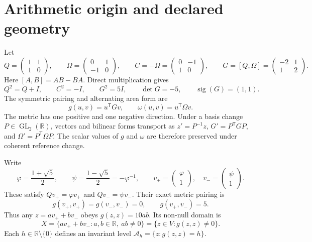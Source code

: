 \documentclass[10pt,letterpaper]{article}
\theoremstyle{definition}\newtheorem{definition}[theorem]{Definition}
\newcommand{\RR}{\mathbb R}
\newcommand{\Id}{I}
\newcommand{\GL}{\operatorname{GL}}
\newcommand{\Ah}{\mathcal A_h}
\newcommand{\ph}{\varphi}
\begin{document}
\section{Arithmetic origin and declared geometry}
Let
\begin{equation}\label{eq:root}
 Q=\begin{pmatrix}1&1\\1&0\end{pmatrix},\qquad
 \Omega=\begin{pmatrix}0&1\\-1&0\end{pmatrix},\qquad
 C=-\Omega=\begin{pmatrix}0&-1\\1&0\end{pmatrix},\qquad
 G=[Q,\Omega]=\begin{pmatrix}-2&1\\1&2\end{pmatrix}.
\end{equation}
Here $[A,B]=AB-BA$. Direct multiplication gives
\begin{equation}\label{eq:rootrels}
 Q^2=Q+\Id,\qquad C^2=-\Id,\qquad G^2=5\Id,\qquad
 \det G=-5,\qquad \operatorname{sig}(G)=(1,1).
\end{equation}
The symmetric pairing and alternating area form are
\begin{equation}
 g(u,v)=u^{\mathsf T}Gv,\qquad \omega(u,v)=u^{\mathsf T}\Omega v.
\end{equation}
The metric has one positive and one negative direction. Under a basis change $P\in\GL_2(\RR)$, vectors and bilinear forms transport as $z'=P^{-1}z$, $G'=P^{\mathsf T}GP$, and $\Omega'=P^{\mathsf T}\Omega P$. The scalar values of $g$ and $\omega$ are therefore preserved under coherent reference change.

Write
\begin{equation}\label{eq:eigen}
 \ph=\frac{1+\sqrt5}{2},\qquad \psi=\frac{1-\sqrt5}{2}=-\ph^{-1},\qquad
 v_+=\begin{pmatrix}\ph\\1\end{pmatrix},\quad
 v_-=\begin{pmatrix}\psi\\1\end{pmatrix}.
\end{equation}
These satisfy $Qv_+=\ph v_+$ and $Qv_-=\psi v_-$. Their exact metric pairing is
\begin{equation}\label{eq:nullpair}
 g(v_+,v_+)=g(v_-,v_-)=0,\qquad g(v_+,v_-)=5.
\end{equation}
Thus any $z=av_++bv_-$ obeys $g(z,z)=10ab$. Its non-null domain is
\begin{equation}\label{eq:X}
 X=\{av_++bv_-:a,b\in\RR,\ ab\ne0\}
   =\{z\in V:g(z,z)\ne0\}.
\end{equation}
Each $h\in\RR\setminus\{0\}$ defines an invariant level $\Ah=\{z:g(z,z)=h\}$.
\end{document}
